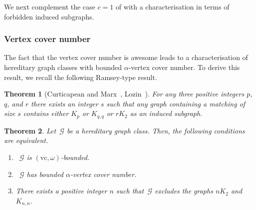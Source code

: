 \documentclass[11pt]{article}
\newcommand{\vc}{\mathrm{vc}}
\theoremstyle{plain}
\newtheorem{theorem}{Theorem}[section]
\theoremstyle{definition}
\theoremstyle{remark}
\numberwithin{equation}{section}
\begin{document}
We next complement the case $c = 1$ of  with a characterisation in terms of forbidden induced subgraphs.

\subsubsection{Vertex cover number}

The fact that the vertex cover number is awesome leads to a characterisation of hereditary graph classes with bounded $\alpha$-vertex cover number.
To derive this result, we recall the following Ramsey-type result.

\begin{theorem}[Curticapean and Marx~\cite{DBLP:conf/focs/CurticapeanM14},  
Lozin~\cite{MR4508171}]\label{thm:matchings}
For any three positive integers $p$, $q$, and $r$ there exists an integer $s$ such that any graph containing a matching of size $s$ contains either $K_p$ or $K_{q,q}$ or $rK_2$ as an induced subgraph.
\end{theorem}
 
\begin{theorem}\label{nK2-Knn}
Let~$\mathcal{G}$ be a hereditary graph class.
Then, the following conditions are equivalent.
\begin{enumerate}
    \item~$\mathcal{G}$ is $(\vc,\omega)$-bounded.
    \item~$\mathcal{G}$ has bounded $\alpha$-vertex cover number.
    \item There exists a positive integer $n$ such that~$\mathcal{G}$ excludes the graphs $nK_2$ and $K_{n,n}$.
\end{enumerate}
\end{theorem}
\end{document}

